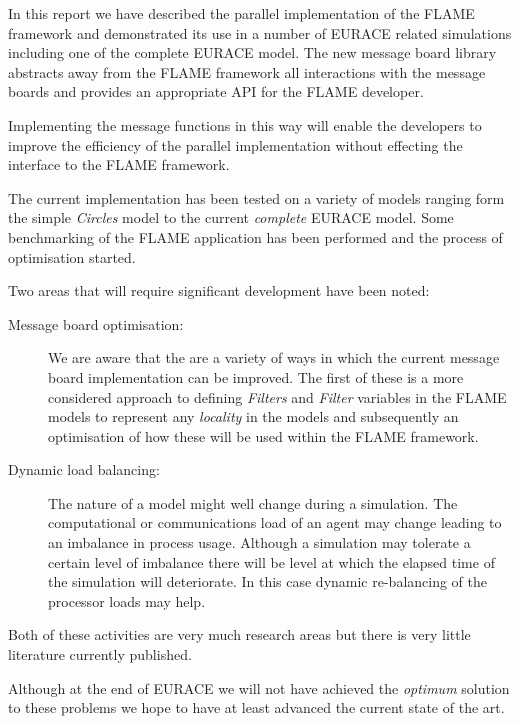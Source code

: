 In this report we have described the parallel implementation of the FLAME framework and
demonstrated its use in a number of EURACE related simulations including one of the complete EURACE model. The new message board library abstracts away from the FLAME framework all interactions with the message boards and provides an appropriate API for the FLAME developer.

Implementing the message functions in this way will enable the developers to improve the  efficiency of the parallel implementation without effecting the interface to the FLAME framework.

The current implementation has been tested on a variety of models ranging form the simple \textsl{Circles} model to the current \textsl{complete} EURACE model. Some benchmarking of the FLAME application has been performed and the process of optimisation started.

Two areas that will require significant development have been noted:
\begin{description}
	\item [Message board optimisation:] We are aware that the are a variety of ways in which the current message board implementation can be improved. The first of these is a more considered approach to defining \textsl{Filters} and \textsl{Filter} variables in the FLAME models to represent any \textsl{locality} in the models and subsequently an optimisation of how these will be used within the FLAME framework.
 \item [Dynamic load balancing:] The nature of a model might well change during a simulation. The computational or communications load of an agent may change leading to an imbalance in process usage. Although a simulation may tolerate a certain level of imbalance there will be level at which the elapsed time of the simulation will deteriorate. In this case dynamic re-balancing of the processor loads may help.
 \end{description}
Both of these activities are very much research areas but there is very little literature currently published.

Although at the end of EURACE we will not have achieved the \textsl{optimum} solution to these problems we hope to have at least advanced the current state of the art.
